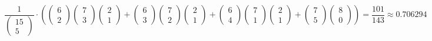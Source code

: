 \documentclass[10pt]{article}
\begin{document}
\begin{easylist}[enumerate]
    \[
        \frac{1}{\begin{pmatrix}15\\5\end{pmatrix}} \cdot
        \left(
            \begin{pmatrix}6\\2\end{pmatrix}\begin{pmatrix}7\\3\end{pmatrix}\begin{pmatrix}2\\1\end{pmatrix}+
            \begin{pmatrix}6\\3\end{pmatrix}\begin{pmatrix}7\\2\end{pmatrix}\begin{pmatrix}2\\1\end{pmatrix}+
            \begin{pmatrix}6\\4\end{pmatrix}\begin{pmatrix}7\\1\end{pmatrix}\begin{pmatrix}2\\1\end{pmatrix}+
            \begin{pmatrix}7\\5\end{pmatrix}\begin{pmatrix}8\\0\end{pmatrix} \right) =
        \boxed{\frac{101}{143} \approx 0.706294}
    \]

\end{easylist}
\end{document}
